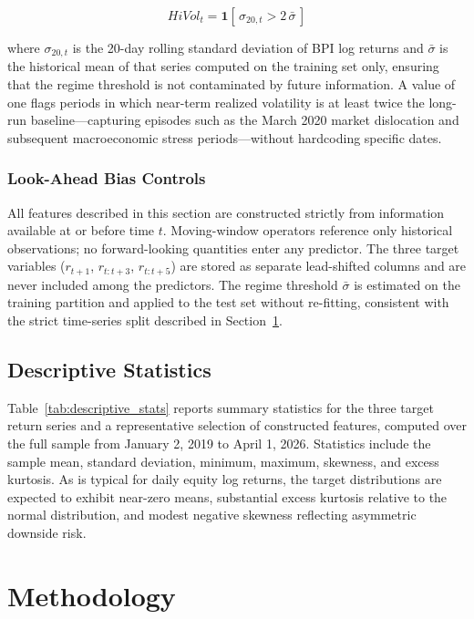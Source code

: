 \documentclass[12pt]{article}
\begin{document}
\begin{equation}
    HiVol_t = \mathbf{1}\!\left[\,\sigma_{20,t} > 2\,\bar{\sigma}\,\right]
\end{equation}

where $\sigma_{20,t}$ is the 20-day rolling standard deviation of BPI log returns and $\bar{\sigma}$ is the historical mean of that series computed on the training set only, ensuring that the regime threshold is not contaminated by future information. A value of one flags periods in which near-term realized volatility is at least twice the long-run baseline---capturing episodes such as the March 2020 market dislocation and subsequent macroeconomic stress periods---without hardcoding specific dates.

\subsubsection*{Look-Ahead Bias Controls}

All features described in this section are constructed strictly from information available at or before time $t$. Moving-window operators reference only historical observations; no forward-looking quantities enter any predictor. The three target variables ($r_{t+1}$, $r_{t:t+3}$, $r_{t:t+5}$) are stored as separate lead-shifted columns and are never included among the predictors. The regime threshold $\bar{\sigma}$ is estimated on the training partition and applied to the test set without re-fitting, consistent with the strict time-series split described in Section~\ref{sec:methodology}.
\subsection{Descriptive Statistics}

Table~\ref{tab:descriptive_stats} reports summary statistics for the three target return series and a representative selection of constructed features, computed over the full sample from January 2, 2019 to April 1, 2026. Statistics include the sample mean, standard deviation, minimum, maximum, skewness, and excess kurtosis. As is typical for daily equity log returns, the target distributions are expected to exhibit near-zero means, substantial excess kurtosis relative to the normal distribution, and modest negative skewness reflecting asymmetric downside risk.

\label{tab:descriptive_stats}


\section{Methodology}
\label{sec:methodology}
\end{document}
